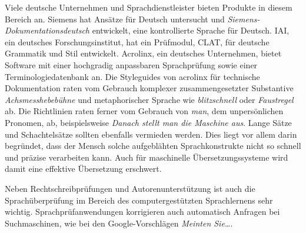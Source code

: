 \documentclass[]{../../metanetpaper}
\begin{document}
\begin{Parallel}[c]{80mm}{80mm}
{Viele deutsche Unternehmen und Sprachdienstleister bieten Produkte in diesem Bereich an. Siemens hat Ansätze für Deutsch untersucht und \textit{Siemens-Dokumentationsdeutsch} entwickelt, eine kontrollierte Sprache für Deutsch. IAI, ein deutsches Forschungsinstitut, hat ein Prüfmodul, CLAT, für deutsche Grammatik und Stil entwickelt. Acrolinx, ein deutsches Unternehmen, bietet Software mit einer hochgradig anpassbaren Sprachprüfung sowie einer Terminologiedatenbank an. Die Styleguides von acrolinx für technische Dokumentation raten vom Gebrauch komplexer zusammengesetzter Substantive \textit{Achsmesshebebühne} und metaphorischer Sprache wie \textit{blitzschnell} oder \textit{Faustregel} ab. Die Richtlinien raten ferner vom Gebrauch von \textit{man}, dem unpersönlichen Pronomen, ab, beispielsweise \textit{Danach stellt man die Maschine aus}. Lange Sätze und Schachtelsätze sollten ebenfalls vermieden werden. Dies liegt vor allem darin begründet, dass der Mensch solche aufgeblähten Sprachkonstrukte nicht so schnell und präzise verarbeiten kann. Auch für maschinelle Übersetzungssysteme wird damit eine effektive Übersetzung erschwert.

Neben Rechtschreibprüfungen und Autorenunterstützung ist auch die Sprachüberprüfung im Bereich des computergestützten Sprachlernens sehr wichtig. Sprachprüfanwendungen korrigieren auch automatisch Anfragen bei Suchmaschinen, wie bei den Google-Vorschlägen \textit{Meinten Sie…}.  }
  
\end{Parallel}
\end{document}
